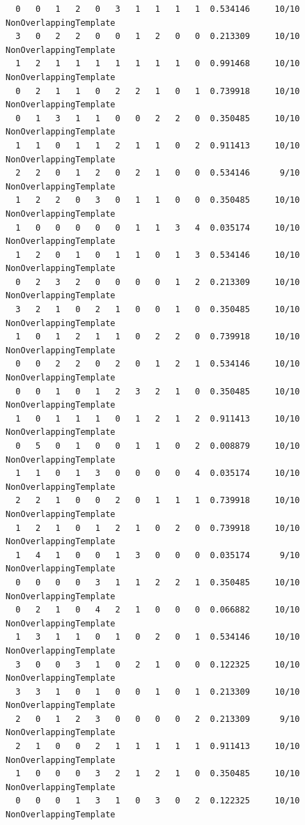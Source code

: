 \documentclass[12pt, titlepage]{report}
\theoremstyle{definition}
\begin{document}
\begin{verbatim}
  0   0   1   2   0   3   1   1   1   1  0.534146     10/10      NonOverlappingTemplate
  3   0   2   2   0   0   1   2   0   0  0.213309     10/10      NonOverlappingTemplate
  1   2   1   1   1   1   1   1   1   0  0.991468     10/10      NonOverlappingTemplate
  0   2   1   1   0   2   2   1   0   1  0.739918     10/10      NonOverlappingTemplate
  0   1   3   1   1   0   0   2   2   0  0.350485     10/10      NonOverlappingTemplate
  1   1   0   1   1   2   1   1   0   2  0.911413     10/10      NonOverlappingTemplate
  2   2   0   1   2   0   2   1   0   0  0.534146      9/10      NonOverlappingTemplate
  1   2   2   0   3   0   1   1   0   0  0.350485     10/10      NonOverlappingTemplate
  1   0   0   0   0   0   1   1   3   4  0.035174     10/10      NonOverlappingTemplate
  1   2   0   1   0   1   1   0   1   3  0.534146     10/10      NonOverlappingTemplate
  0   2   3   2   0   0   0   0   1   2  0.213309     10/10      NonOverlappingTemplate
  3   2   1   0   2   1   0   0   1   0  0.350485     10/10      NonOverlappingTemplate
  1   0   1   2   1   1   0   2   2   0  0.739918     10/10      NonOverlappingTemplate
  0   0   2   2   0   2   0   1   2   1  0.534146     10/10      NonOverlappingTemplate
  0   0   1   0   1   2   3   2   1   0  0.350485     10/10      NonOverlappingTemplate
  1   0   1   1   1   0   1   2   1   2  0.911413     10/10      NonOverlappingTemplate
  0   5   0   1   0   0   1   1   0   2  0.008879     10/10      NonOverlappingTemplate
  1   1   0   1   3   0   0   0   0   4  0.035174     10/10      NonOverlappingTemplate
  2   2   1   0   0   2   0   1   1   1  0.739918     10/10      NonOverlappingTemplate
  1   2   1   0   1   2   1   0   2   0  0.739918     10/10      NonOverlappingTemplate
  1   4   1   0   0   1   3   0   0   0  0.035174      9/10      NonOverlappingTemplate
  0   0   0   0   3   1   1   2   2   1  0.350485     10/10      NonOverlappingTemplate
  0   2   1   0   4   2   1   0   0   0  0.066882     10/10      NonOverlappingTemplate
  1   3   1   1   0   1   0   2   0   1  0.534146     10/10      NonOverlappingTemplate
  3   0   0   3   1   0   2   1   0   0  0.122325     10/10      NonOverlappingTemplate
  3   3   1   0   1   0   0   1   0   1  0.213309     10/10      NonOverlappingTemplate
  2   0   1   2   3   0   0   0   0   2  0.213309      9/10      NonOverlappingTemplate
  2   1   0   0   2   1   1   1   1   1  0.911413     10/10      NonOverlappingTemplate
  1   0   0   0   3   2   1   2   1   0  0.350485     10/10      NonOverlappingTemplate
  0   0   0   1   3   1   0   3   0   2  0.122325     10/10      NonOverlappingTemplate

\end{verbatim}
\end{document}
